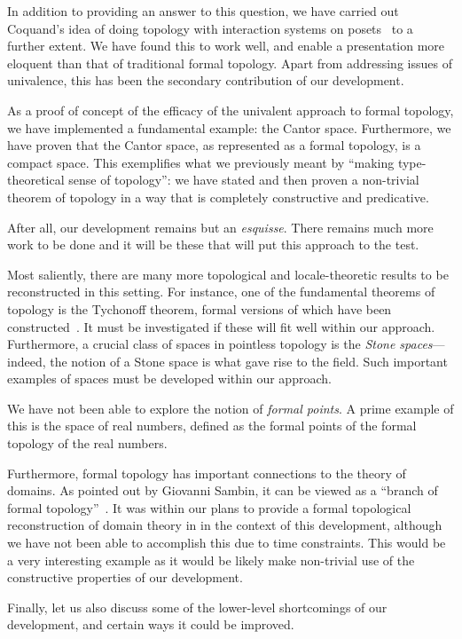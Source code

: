 In addition to providing an answer to this question, we have carried out Coquand's idea of
doing topology with interaction systems on posets~\cite{coq-posets} to a further extent.
We have found this to work well, and enable a presentation more eloquent than that of
traditional formal topology. Apart from addressing issues of univalence, this has been the
secondary contribution of our development.

As a proof of concept of the efficacy of the univalent approach to formal topology, we
have implemented a fundamental example: the Cantor space. Furthermore, we have proven that
the Cantor space, as represented as a formal topology, is a compact space. This
exemplifies what we previously meant by ``making type-theoretical sense of topology'': we
have stated and then proven a non-trivial theorem of topology in a way that is completely
constructive and predicative.

After all, our development remains but an \emph{esquisse}. There remains much more work to
be done and it will be these that will put this approach to the test.

Most saliently, there are many more topological and locale-theoretic results to be
reconstructed in this setting. For instance, one of the fundamental theorems of topology
is the Tychonoff theorem, formal versions of which have been
constructed~\cite{coq-tychonoff}. It must be investigated if these will fit well within
our approach. Furthermore, a crucial class of spaces in pointless topology is the
\emph{Stone spaces}---indeed, the notion of a Stone space is what gave rise to the field.
Such important examples of spaces must be developed within our approach.

We have not been able to explore the notion of \emph{formal points}. A prime example of
this is the space of real numbers, defined as the formal points of the formal topology of
the real numbers.

Furthermore, formal topology has important connections to the theory of domains. As
pointed out by Giovanni Sambin, it can be viewed as a ``branch of formal
topology''~\cite{sambin-domains}. It was within our plans to provide a formal topological
reconstruction of domain theory in \UF{} in the context of this development, although we
have not been able to accomplish this due to time constraints. This would be a very
interesting example as it would be likely make non-trivial use of the constructive
properties of our development.

Finally, let us also discuss some of the lower-level shortcomings of our development, and
certain ways it could be improved.

